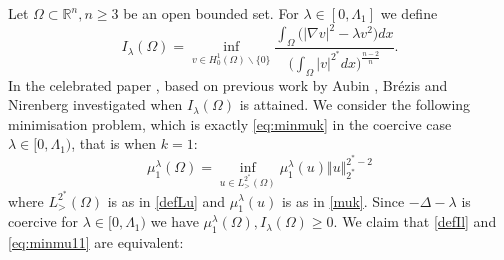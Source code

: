 \documentclass[10pt]{amsart}
\numberwithin{equation}{section}
\newcommand{\R}{\mathbb{R}}
\newcommand{\Om}{\Omega}
\theoremstyle{plain}
\theoremstyle{remark}
\begin{document}
Let $\Om \subset \R^n, n \ge 3$ be an open bounded set. For $\lambda \in [0, \Lambda_1]$ we define 
\begin{equation} \label{defIl}
I_\lambda(\Om) = \inf_{v \in H^1_0(\Om)\backslash \{0\}} \frac{\int_{\Om} \big( |\nabla v|^2 - \lambda v^2 \big)dx}{\big(\int_{\Om}|v|^{2^*}dx \big)^{\frac{n-2}{n}}}.
\end{equation}
In the celebrated paper \cite{BN}, based on previous work by Aubin \cite{AubinYamabe}, Br\'ezis and Nirenberg investigated when $I_\lambda(\Om)$ is attained. We consider the following minimisation problem, which is exactly \eqref{eq:minmuk} in the coercive case $ \lambda \in [0, \Lambda_1)$, that is when $k=1$:
 \begin{equation} \label{eq:minmu11}
\mu_1^{\lambda}(\Om) = \inf_{u \in L^{2^*}_>(\Om)} \mu_1^{\lambda}(u) \Vert u \Vert_{2^*}^{2^*-2} 
\end{equation}
where $L^{2^*}_{>}(\Om)$ is as in \eqref{defLu} and $\mu_1^{\lambda}(u)$ is as in \eqref{muk}. Since $- \Delta -\lambda$ is coercive for $\lambda \in [0, \Lambda_1)$ we have $\mu_1^{\lambda}(\Om), I_\lambda(\Om) \ge 0$. We claim that \eqref{defIl} and \eqref{eq:minmu11}  are equivalent:
\end{document}
